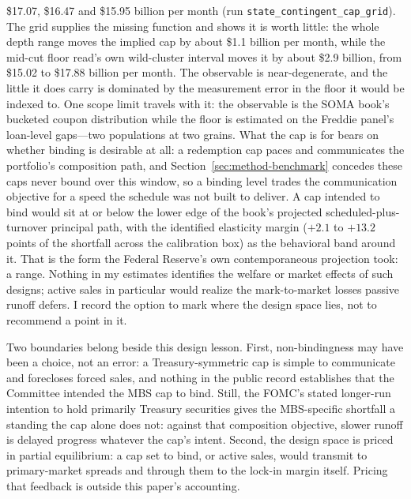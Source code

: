 \documentclass[12pt]{article}
\begin{document}
\$17.07, \$16.47 and \$15.95 billion per month (run \texttt{state\_contingent\_cap\_grid}). The grid supplies the missing function and shows it is worth little: the whole depth range moves the implied cap by about \$1.1 billion per month, while the mid-cut floor read's own wild-cluster interval moves it by about \$2.9 billion, from \$15.02 to \$17.88 billion per month. The observable is near-degenerate, and the little it does carry is dominated by the measurement error in the floor it would be indexed to. One scope limit travels with it: the observable is the SOMA book's bucketed coupon distribution while the floor is estimated on the Freddie panel's loan-level gaps---two populations at two grains. What the cap is for bears on whether binding is desirable at all: a redemption cap paces and communicates the portfolio's composition path, and Section~\ref{sec:method-benchmark} concedes these caps never bound over this window, so a binding level trades the communication objective for a speed the schedule was not built to deliver. A cap intended to bind would sit at or below the lower edge of the book's projected scheduled-plus-turnover principal path, with the identified elasticity margin ($+2.1$ to $+13.2$ points of the shortfall across the calibration box) as the behavioral band around it. That is the form the Federal Reserve's own contemporaneous projection took: a range. Nothing in my estimates identifies the welfare or market effects of such designs; active sales in particular would realize the mark-to-market losses passive runoff defers. I record the option to mark where the design space lies, not to recommend a point in it.

Two boundaries belong beside this design lesson. First, non-bindingness may have been a choice, not an error: a Treasury-symmetric cap is simple to communicate and forecloses forced sales, and nothing in the public record establishes that the Committee intended the MBS cap to bind. Still, the FOMC's stated longer-run intention to hold primarily Treasury securities gives the MBS-specific shortfall a standing the cap alone does not: against that composition objective, slower runoff is delayed progress whatever the cap's intent. Second, the design space is priced in partial equilibrium: a cap set to bind, or active sales, would transmit to primary-market spreads and through them to the lock-in margin itself. Pricing that feedback is outside this paper's accounting.
\end{document}
